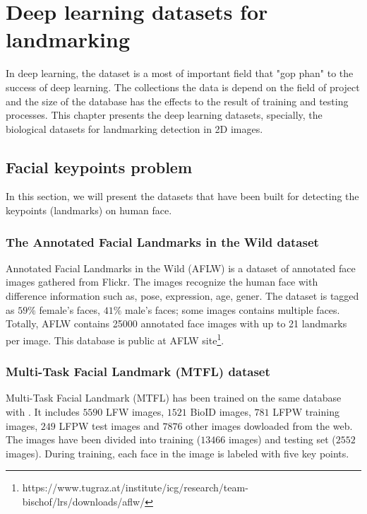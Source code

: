 \chapter{Deep learning datasets for landmarking}
In deep learning, the dataset is a most of important field that "gop phan" to the success of deep learning. The collections the data is depend on the field of project and the size of the database has the effects to the result of training and testing processes. This chapter presents the deep learning datasets, specially, the biological datasets for landmarking detection in 2D images. 
\section{Facial keypoints problem}
In this section, we will present the datasets that have been built for detecting the keypoints (landmarks) on human face.

\subsection{The Annotated Facial Landmarks in the Wild dataset}
Annotated Facial Landmarks in the Wild (AFLW) \cite{koestinger11a} is a dataset of annotated face images gathered from Flickr. The images recognize the human face with difference  information such as, pose, expression, age, gener. The dataset is tagged as  $59\%$ female's faces, $41\%$  male's faces; some images contains multiple faces. Totally, AFLW contains 25000 annotated face images with up to 21 landmarks per image. This database is public at AFLW site\footnote{https://www.tugraz.at/institute/icg/research/team-bischof/lrs/downloads/aflw/}.
\subsection{Multi-Task Facial Landmark (MTFL) dataset}
Multi-Task Facial Landmark (MTFL) has been trained on the same database with \cite{sun2013deep}. It includes $5590$ LFW images, $1521$ BioID images, $781$ LFPW training images, $249$ LFPW test images and $7876$ other images dowloaded from the web. The images have been divided into training ($13466$ images) and testing set ($2552$ images). During training, each face in the image is labeled with five key points. 
